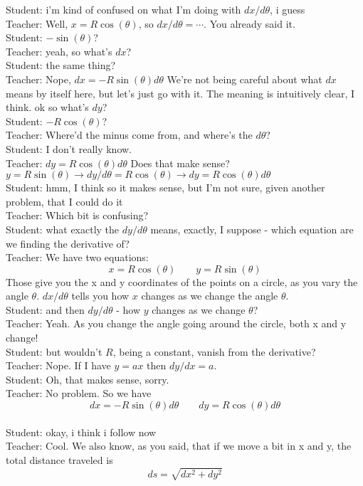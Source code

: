 Student: i'm kind of confused on what I'm doing with $dx/d\theta$, i guess\\
Teacher: Well, $x = R \cos(\theta)$, so $dx/d\theta = \cdots$. You already said it.\\
Student: $-\sin(\theta)$?\\
Teacher: yeah, so what's $dx$?\\
Student: the same thing?\\
Teacher: Nope, $dx = - R \sin(\theta) d\theta$
We're not being careful about what $dx$ means by itself here, but let's just go with it.
The meaning is intuitively clear, I think.
ok so what's $dy$?\\
Student: $-R\cos(\theta)$?\\
Teacher: Where'd the minus come from, and where's the $d\theta$?\\
Student: I don't really know.\\
Teacher: $dy = R \cos(\theta) d\theta$
Does that make sense?
$y = R \sin(\theta) \rightarrow dy/d\theta = R \cos(\theta) \rightarrow dy = R \cos(\theta) d\theta$\\
Student: hmm, I think so
it makes sense, but I'm not sure, given another problem, that I could do it\\
Teacher: Which bit is confusing?\\
Student: what exactly the $dy/d\theta$ means, exactly, I suppose - which equation are we finding the derivative of?\\
Teacher: We have two equations: $$x = R \cos(\theta) \qquad y = R \sin(\theta)$$
Those give you the x and y coordinates of the points on a circle, as you vary the angle $\theta$.
$dx/d\theta$ tells you how $x$ changes as we change the angle $\theta$.\\
Student: and then $dy/d\theta$ - how $y$ changes as we change $\theta$?\\
Teacher: Yeah. As you change the angle going around the circle, both x and y change!\\
Student: but wouldn't $R$, being a constant, vanish from the derivative?\\
Teacher: Nope. If I have $y = a x$ then $dy/dx = a$.\\
Student: Oh, that makes sense, sorry.\\
Teacher: No problem. So we have $$dx = - R \sin(\theta) d\theta \qquad dy = R \cos(\theta) d\theta$$\\
Student: okay, i think i follow now\\
Teacher: Cool. We also know, as you said, that if we move a bit in x and y, the total distance traveled is $$ds = \sqrt{dx^2 + dy^2}$$\\
